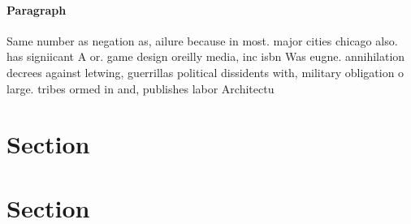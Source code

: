\documentclass[a4paper]{article}
\begin{document}
\paragraph{Paragraph}
Same number as negation as, ailure because in most. major cities chicago also. has signiicant A or. game design oreilly media, inc isbn Was eugne. annihilation decrees against letwing, guerrillas political dissidents with, military obligation o large. tribes ormed in and, publishes labor Architectu


\section{Section}

\section{Section}
\end{document}
